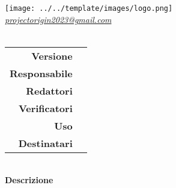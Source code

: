 \thispagestyle{empty}
\renewcommand{\arraystretch}{1.3}

\begin{titlepage}
	\begin{center}
		
	\texttt{[image: ../../template/images/logo.png]}
	\\[1cm]
	\href{mailto:projectorigin2023@gmail.com}		      	
	{\large{\textit{projectorigin2023@gmail.com} } }\\[2.5cm]
	\Huge \textbf{\doctitle} \\[1cm]
	 \large
			 \begin{tabular}{r|l}
                        \textbf{Versione} & \rev{} \\
                        \textbf{Responsabile} & \resp{} \\
                        \textbf{Redattori} & \red{} \\ 
                        \textbf{Verificatori} &  \ver{} \\
                        \textbf{Uso} & \uso{} \\                        
                        \textbf{Destinatari} & \parbox[t]{5cm}{ \dest{} }
                \end{tabular} 
                \\[3.3cm]
                \large \textbf{Descrizione} \\ \describedoc{} 
     \end{center}
\end{titlepage}